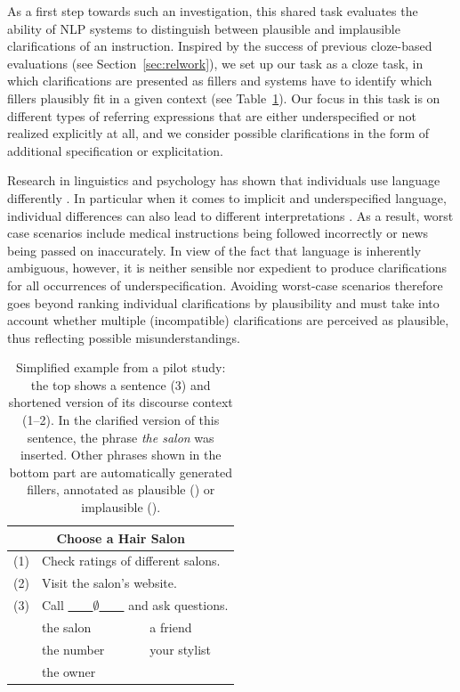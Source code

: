 \documentclass[11pt]{article}
\newcommand{\cmark}{\ding{51}}%
\newcommand{\xmark}{\ding{55}}%
\begin{document}
As a first step towards such an investigation, this shared task evaluates the ability of NLP systems to distinguish between plausible and implausible clarifications of an instruction. 
Inspired by the success of previous cloze-based evaluations (see Section~\ref{sec:relwork}), we set up our task as a cloze task, in which clarifications are presented as fillers and systems have to identify which fillers plausibly fit in a given context (see Table~\ref{tbl:example}). Our focus in this task is on different types of referring expressions that are either underspecified or not realized explicitly at all, and we consider possible clarifications in the form of additional specification or explicitation.  

Research in linguistics and psychology has shown that individuals use language differently \cite{Pennebaker:1999:styles,Heylighen:2002:variation}. In particular when it comes to implicit and underspecified language, individual differences can also lead to different interpretations \cite{scholman-demberg-2017-crowdsourcing,poesio-etal-2019-crowdsourced}. 
As a result, worst case scenarios include medical instructions being followed incorrectly or news being passed on inaccurately.
In view of the fact that language is inherently ambiguous, however, it is neither sensible nor expedient to produce clarifications for all occurrences of underspecification. Avoiding worst-case scenarios therefore goes beyond ranking individual clarifications by plausibility and must take into account whether multiple (incompatible) clarifications are perceived as plausible, thus reflecting possible misunderstandings. 

\begin{table}[t!]
\centering
\begin{tabular}{cl@{\quad\quad}cl}
\toprule
\multicolumn{4}{c}{\textbf{Choose a Hair Salon}} \\
\midrule
(1) & \multicolumn{3}{l}{Check ratings of different salons.}\\
(2) & \multicolumn{3}{l}{Visit the salon's website.}\\
(3) & \multicolumn{3}{l}{Call \underline{~~~~$\emptyset$~~~~} and ask questions.}\\
\midrule
\cmark & the salon  & \xmark & a friend\\
\cmark & the number & \xmark & your stylist\\
\cmark & \multicolumn{3}{l}{the owner}\\%
\bottomrule
\end{tabular}
\caption{Simplified example from a pilot study: the top shows a sentence (3) and shortened version of its discourse context (1--2). In the clarified version of this sentence, the phrase \textit{the salon} was inserted. Other phrases shown in the bottom part are automatically generated fillers, annotated as plausible (\cmark) or implausible (\xmark).}
\label{tbl:example}
\end{table}
\end{document}
